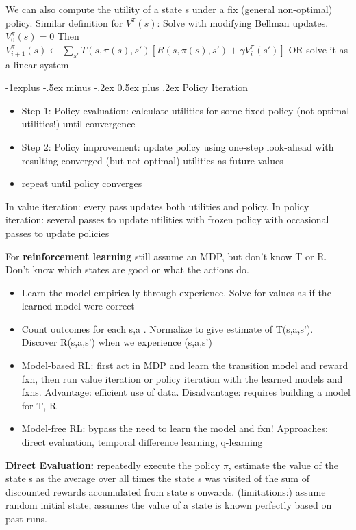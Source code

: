 \documentclass[10pt]{article}
\makeatletter
\renewcommand{\subsection}{\@startsection{subsection}{2}{0mm}%
                                {-1explus -.5ex minus -.2ex}%
                                {0.5ex plus .2ex}%
                                {\normalfont\normalsize\bfseries}}
\makeatother
\begin{document}
\begin{multicols*}{2}
	We can also compute the utility of a state s under a fix (general non-optimal) policy. Similar definition for $V^\pi(s)$:
Solve with modifying Bellman updates.
		$V_0^\pi(s)=0$
		Then $V_{i+1}^\pi(s)\leftarrow \displaystyle\sum_{s'}T(s,\pi(s),s')[R(s,\pi(s),s')+\gamma V_i^\pi(s')]$
		 OR solve it as a linear system
		 
\subsection{Policy Iteration}
	\begin{itemize}
		\item Step 1: Policy evaluation: calculate utilities for some fixed policy (not optimal utilities!) until convergence
		\item Step 2: Policy improvement: update policy using one-step look-ahead with resulting converged (but not optimal) utilities as future values
		\item repeat until policy converges
	\end{itemize}
	In value iteration: every pass updates both utilities and policy. In policy iteration: several passes to update utilities with frozen policy with occasional passes to update policies

	For {\bf reinforcement learning} still assume an MDP, but don't know T or R. Don't know which states are good or what the actions do.
	\begin{itemize}
		\item Learn the model empirically through experience. Solve for values as if the learned model were correct
		\item Count outcomes for each s,a . Normalize to give estimate of T(s,a,s'). Discover R(s,a,s') when we experience (s,a,s')
		\item Model-based RL: first act in MDP and learn the transition model and reward fxn, then run value iteration or policy iteration with the learned models and fxns. Advantage: efficient use of data. Disadvantage: requires building a model for T, R
		\item Model-free RL: bypass the need to learn the model and fxn! Approaches: direct evaluation, temporal difference learning, q-learning
	\end{itemize}
	\textbf{Direct Evaluation: }repeatedly execute the policy $\pi$, estimate the value of the state s as the average over all times the state s was visited of the sum of discounted rewards accumulated from state s onwards. (limitations:) assume random initial state, assumes the value of a state is known perfectly based on past runs.

\end{multicols*}
\end{document}
